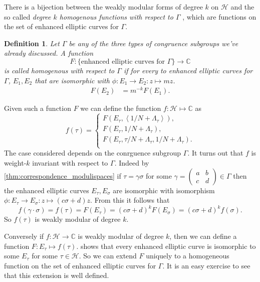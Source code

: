 \documentclass[a4paper]{article}
\theoremstyle{theoremdd}
\theoremstyle{definitiondd}
\newtheorem{definition}[theorem]{Definition}
\theoremstyle{remarkdd}
\newcommand{\C}{\mathbb{C}}
\begin{document}
There is a bijection between the weakly modular forms of degree $k$ on $\mathcal{H}$ and the so called  \emph{degree $k$ homogenous functions with respect to $\Gamma$ }, which are functions on the set of enhanced elliptic curves for $\Gamma$. 
\begin{definition}
	Let $\Gamma$ be any of the three types of congruence subgroups we've already discussed. 
	A function \[
	F: \{\text{enhanced elliptic curves for $\Gamma$}\} \to \C
	\]
	is called \emph{homogenous with respect to $\Gamma$} if for every to enhanced elliptic curves for $\Gamma$, $E_1, E_2$ that are isomorphic with $\phi:E_1 \to E_2: z\mapsto m z $.
		\begin{align*}
			F\left(E_2\right) &= m^{-k}F\left(E_1\right) 
		.\end{align*}
\end{definition}
Given such a function $F$ we can define the function $f: \mathcal{H} \mapsto  \C$  as \[
	f(\tau) = \begin{cases}
		F(E_\tau, \left<1 / N + \Lambda_\tau\right>), \\
		F(E_\tau, 1 / N + \Lambda_\tau), \\
		F(E_\tau, \tau / N + \Lambda_\tau, 1 / N + \Lambda_\tau). \\
	\end{cases}
\] 
The case considered depends on the conrguence subgroup $\Gamma$.
It turns out that  $f$ is weight-$k$ invariant with respect to $\Gamma$. Indeed by \cref{thm:correspondence_modulispaces} if $\tau = \gamma \sigma$ for some  $\gamma = \begin{pmatrix} a & b \\ c & d \end{pmatrix}  \in \Gamma$ then the enhanced elliptic curves  $E_\tau, E_\sigma$ are isomorphic with isomorphism $\phi: E_\tau \to E_\sigma: z \mapsto (c \sigma + d) z$.
From this it follows that \[
	f(\gamma\cdot \sigma) = f(\tau) = F(E_\tau) = (c \sigma + d)^{k}F(E_\sigma) = (c \sigma + d)^{k}f(\sigma)
.\]
So $f(\tau )$ is weakly modular of degree $k$.

Conversely if $f: \mathcal{H}  \to \C$ is weakly modular of degree $k$, then we can define a function $F: E_\tau\mapsto f(\tau)$. 
 shows that every enhanced elliptic curve is isomorphic to some $E_\tau$ for some $\tau \in \mathcal{H} $. So we can extend $F$ uniquely to a homogeneous function on the set of enhanced elliptic curves for  $\Gamma$. 
It is an easy exercise to see that this extension is well defined. 
\end{document}

